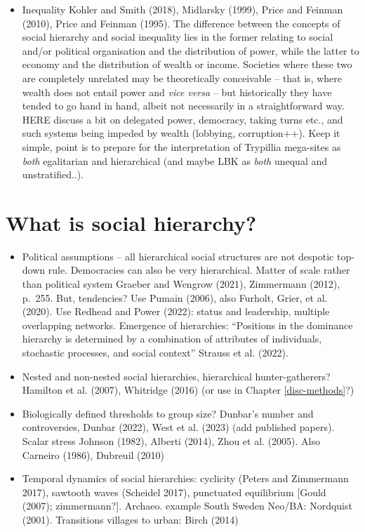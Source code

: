 \documentclass[
  12pt,
]{book}
\providecommand{\tightlist}{%
  \setlength{\itemsep}{0pt}\setlength{\parskip}{0pt}}
\begin{document}
\begin{itemize}
\tightlist
\item
  Inequality Kohler and Smith (2018), Midlarsky (1999), Price and Feinman (2010), Price and Feinman (1995). The difference between the concepts of social hierarchy and social inequality lies in the former relating to social and/or political organisation and the distribution of power, while the latter to economy and the distribution of wealth or income. Societies where these two are completely unrelated may be theoretically conceivable -- that is, where wealth does not entail power and \emph{vice versa} -- but historically they have tended to go hand in hand, albeit not necessarily in a straightforward way. HERE discuss a bit on delegated power, democracy, taking turns etc., and such systems being impeded by wealth (lobbying, corruption++). Keep it simple, point is to prepare for the interpretation of Trypillia mega-sites as \emph{both} egalitarian and hierarchical (and maybe LBK as \emph{both} unequal and unstratified..).
\end{itemize}

\hypertarget{social-hierarchy}{%
\section{What is social hierarchy?}\label{social-hierarchy}}

\begin{itemize}
\item
  Political assumptions -- all hierarchical social structures are not despotic top-down rule. Democracies can also be very hierarchical. Matter of scale rather than political system Graeber and Wengrow (2021), Zimmermann (2012), p.~255. But, tendencies? Use Pumain (2006), also Furholt, Grier, et al. (2020). Use Redhead and Power (2022): status and leadership, multiple overlapping networks. Emergence of hierarchies: ``Positions in the dominance hierarchy is determined by a combination of attributes of individuals, stochastic processes, and social context'' Strauss et al. (2022).
\item
  Nested and non-nested social hierarchies, hierarchical hunter-gatherers? Hamilton et al. (2007), Whitridge (2016) (or use in Chapter \ref{disc-methods}?)
\item
  Biologically defined thresholds to group size? Dunbar's number and controversies, Dunbar (2022), West et al. (2023) (add published papers). Scalar stress Johnson (1982), Alberti (2014), Zhou et al. (2005). Also Carneiro (1986), Dubreuil (2010)
\item
  Temporal dynamics of social hierarchies: cyclicity (Peters and Zimmermann 2017), sawtooth waves (Scheidel 2017), punctuated equilibrium {[}Gould (2007); zimmermann?{]}. Archaeo. example South Sweden Neo/BA: Nordquist (2001). Transitions villages to urban: Birch (2014)
\end{itemize}
\end{document}
